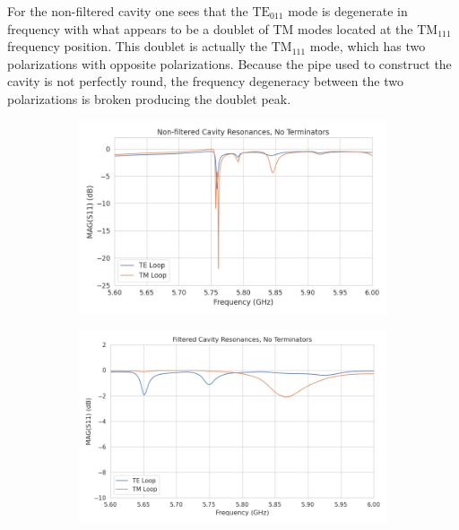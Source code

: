 For the non-filtered cavity one sees that the $\mathrm{TE}_{011}$ mode is degenerate in frequency with what appears to be a doublet of TM modes located at the $\mathrm{TM}_{111}$ frequency position. This doublet is actually the $\mathrm{TM}_{111}$ mode, which has two polarizations with opposite polarizations. Because the pipe used to construct the cavity is not perfectly round, the frequency degeneracy between the two polarizations is broken producing the doublet peak.
\begin{figure}[htbp]
    \centering
    \begin{subfigure}{0.48\textwidth}
        \includegraphics*[width=\textwidth]{figs/Chapter-6/230613_TETM_nofilter_cav_no_term.png}
        \caption{}
    \end{subfigure}
    \hfill
    \begin{subfigure}{0.48\textwidth}
        \includegraphics*[width=\textwidth]{figs/Chapter-6/230613_TETM_filter_cav_no_term.png}
        \caption{}
    \end{subfigure}

\end{figure}
